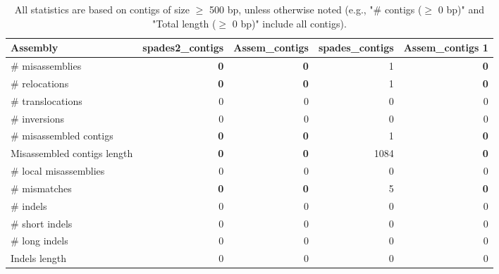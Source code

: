 \documentclass[12pt,a4paper]{article}
\begin{document}
\begin{table}[ht]
\begin{center}
\caption{All statistics are based on contigs of size $\geq$ 500 bp, unless otherwise noted (e.g., "\# contigs ($\geq$ 0 bp)" and "Total length ($\geq$ 0 bp)" include all contigs).}
\begin{tabular}{|l*{4}{|r}|}
\hline
Assembly & spades2\_contigs & Assem\_contigs & spades\_contigs & Assem\_contigs 1 \\ \hline
\# misassemblies & {\bf 0} & {\bf 0} & 1 & {\bf 0} \\ \hline
\hspace{5mm}\# relocations & {\bf 0} & {\bf 0} & 1 & {\bf 0} \\ \hline
\hspace{5mm}\# translocations & 0 & 0 & 0 & 0 \\ \hline
\hspace{5mm}\# inversions & 0 & 0 & 0 & 0 \\ \hline
\# misassembled contigs & {\bf 0} & {\bf 0} & 1 & {\bf 0} \\ \hline
Misassembled contigs length & {\bf 0} & {\bf 0} & 1084 & {\bf 0} \\ \hline
\# local misassemblies & 0 & 0 & 0 & 0 \\ \hline
\# mismatches & {\bf 0} & {\bf 0} & 5 & {\bf 0} \\ \hline
\# indels & 0 & 0 & 0 & 0 \\ \hline
\hspace{5mm}\# short indels & 0 & 0 & 0 & 0 \\ \hline
\hspace{5mm}\# long indels & 0 & 0 & 0 & 0 \\ \hline
Indels length & 0 & 0 & 0 & 0 \\ \hline
\end{tabular}
\end{center}
\end{table}
\end{document}
